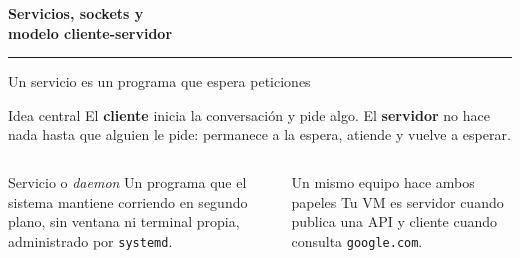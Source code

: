 \documentclass[aspectratio=169,10pt,c]{beamer}
\begin{document}
\begin{frame}[plain]
\vfill
\begin{center}
{\fontsize{29}{34}\selectfont\bfseries Servicios, sockets y\\ modelo cliente-servidor}\par
\vspace{4mm}
{\color{utpRojo}\rule{8.5cm}{1.2pt}}
\end{center}
\vfill
\end{frame}

\begin{frame}{Un servicio es un programa que espera peticiones}
\begin{block}{Idea central}
\small El \textbf{cliente} inicia la conversación y pide algo. El \textbf{servidor} no hace nada hasta que alguien le pide: permanece a la espera, atiende y vuelve a esperar.
\end{block}
\begin{center}
\end{center}
\begin{columns}[T,onlytextwidth]
\begin{exampleblock}{Servicio o \emph{daemon}}
\small Un programa que el sistema mantiene corriendo en segundo plano, sin ventana ni terminal propia, administrado por \texttt{systemd}.
\end{exampleblock}
\begin{exampleblock}{Un mismo equipo hace ambos papeles}
\small Tu VM es servidor cuando publica una API y cliente cuando consulta \texttt{google.com}.
\end{exampleblock}
\end{columns}
\end{frame}
\end{document}
